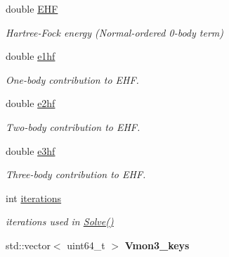 \begin{DoxyCompactItemize}
double \hyperlink{classHartreeFock_a16c9e1791919c2ceef5584bdc9b84a81}{E\+HF}
\begin{DoxyCompactList}\small\item\em Hartree-\/\+Fock energy (Normal-\/ordered 0-\/body term) \end{DoxyCompactList}\item 
\mbox{\label{classHartreeFock_a0f94913a966701c27fde108b98e89b41}} 
double \hyperlink{classHartreeFock_a0f94913a966701c27fde108b98e89b41}{e1hf}
\begin{DoxyCompactList}\small\item\em One-\/body contribution to E\+HF. \end{DoxyCompactList}\item 
\mbox{\label{classHartreeFock_a29cddead4c300ca5c3505f04e1a630bc}} 
double \hyperlink{classHartreeFock_a29cddead4c300ca5c3505f04e1a630bc}{e2hf}
\begin{DoxyCompactList}\small\item\em Two-\/body contribution to E\+HF. \end{DoxyCompactList}\item 
\mbox{\label{classHartreeFock_a89a37a2413483b1b484554c4a4f6755e}} 
double \hyperlink{classHartreeFock_a89a37a2413483b1b484554c4a4f6755e}{e3hf}
\begin{DoxyCompactList}\small\item\em Three-\/body contribution to E\+HF. \end{DoxyCompactList}\item 
\mbox{\label{classHartreeFock_a7658fa0b1b05dfa7bf7b8aa7e5fd6bb3}} 
int \hyperlink{classHartreeFock_a7658fa0b1b05dfa7bf7b8aa7e5fd6bb3}{iterations}
\begin{DoxyCompactList}\small\item\em iterations used in \hyperlink{classHartreeFock_a0666507747c17845ab4f74b97414703c}{Solve()} \end{DoxyCompactList}\item 
\mbox{\label{classHartreeFock_aac4104112ce3a60a8fb86305df98d2e9}} 
std\+::vector$<$ uint64\+\_\+t $>$ {\bfseries Vmon3\+\_\+keys}
\item 
\mbox{\label{classHartreeFock_ad7ca83cf6ad8949daffd11ba8f2c03fd}} 

\end{DoxyCompactItemize}
